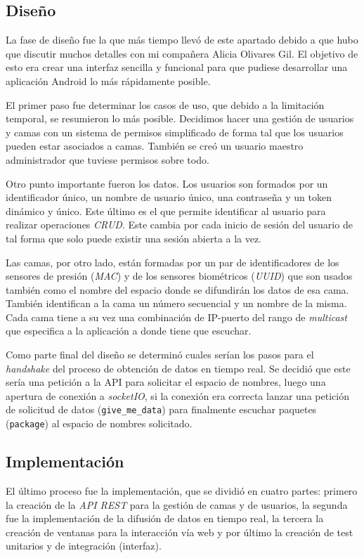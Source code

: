 \subsection{Diseño}
La fase de diseño fue la que más tiempo llevó de este apartado debido a que hubo que discutir muchos detalles con mi compañera Alicia Olivares Gil. El objetivo de esto era crear una interfaz sencilla y funcional para que pudiese desarrollar una aplicación Android lo más rápidamente posible.

El primer paso fue determinar los casos de uso, que debido a la limitación temporal, se resumieron lo más posible. Decidimos hacer una gestión de usuarios y camas con un sistema de permisos simplificado de forma tal que los usuarios pueden estar asociados a camas. También se creó un usuario maestro administrador que tuviese permisos sobre todo.

Otro punto importante fueron los datos. Los usuarios son formados por un identificador único, un nombre de usuario único, una contraseña y un token dinámico y único. Este último es el que permite identificar al usuario para realizar operaciones \textit{CRUD}. Este cambia por cada inicio de sesión del usuario de tal forma que solo puede existir una sesión abierta a la vez.

Las camas, por otro lado, están formadas por un par de identificadores de los sensores de presión (\textit{MAC}) y de los sensores biométricos (\textit{UUID}) que son usados también como el nombre del espacio donde se difundirán los datos de esa cama. También identifican a la cama un número secuencial y un nombre de la misma. Cada cama tiene a su vez una combinación de IP-puerto del rango de \textit{multicast} que especifica a la aplicación a donde tiene que escuchar. 

Como parte final del diseño se determinó cuales serían los pasos para el \textit{handshake} del proceso de obtención de datos en tiempo real. Se decidió que este sería una petición a la API para solicitar el espacio de nombres, luego una apertura de conexión a \textit{socketIO}, si la conexión era correcta lanzar una petición de solicitud de datos (\texttt{give\_me\_data}) para finalmente escuchar paquetes (\texttt{package}) al espacio de nombres solicitado.

\subsection{Implementación}
El último proceso fue la implementación, que se dividió en cuatro partes: primero la creación de la \textit{API REST} para la gestión de camas y de usuarios, la segunda fue la implementación de la difusión de datos en tiempo real, la tercera la creación de ventanas para la interacción vía web y por último la creación de test unitarios y de integración (interfaz).


